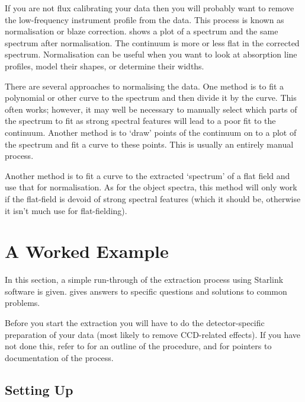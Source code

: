 If you are not flux calibrating your data then you will probably want to
remove the low-frequency instrument profile from the data.  This process
is known as normalisation or blaze correction.
 shows a plot of
a spectrum and the same spectrum after normalisation.
The continuum is more or less flat in the corrected spectrum.
Normalisation can be useful when you want to look at absorption line
profiles, model their shapes, or determine their widths.

There are several approaches to normalising the data.
One method is to fit a polynomial or other curve to the
spectrum and then divide it by the curve.
This often works; however, it may well be necessary to manually
select which parts of the spectrum to fit as strong spectral
features will lead to a poor fit to the continuum.
Another method is to `draw' points of the continuum on to a plot
of the spectrum and fit a curve to these points.
This is usually an entirely manual process.

Another method is to fit a curve to the extracted `spectrum' of a
flat field and use that for normalisation.
As for the object spectra, this method will only work if the flat-field
is devoid of strong spectral features (which it should be, otherwise it
isn't much use for flat-fielding).


\section{A Worked Example}

In this section, a simple run-through of the extraction process using
Starlink software is given.
gives answers to specific questions and solutions to common problems.

Before you start the extraction you will have to do the
detector-specific preparation of your data (most likely to remove
CCD-related effects).
If you have not done this, refer to \scspec{\S\ref{image_preparation}}
{} for an outline of the
procedure, and \scspec{\S\ref{other_sources}}
{} for pointers
to documentation of the process.


\subsection{Setting Up}

